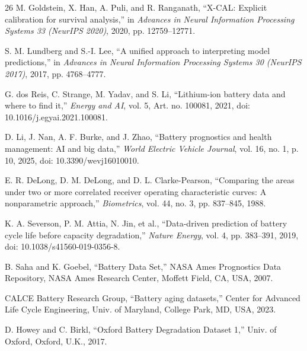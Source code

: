 \documentclass[conference]{IEEEtran}
\begin{document}
\begin{thebibliography}{26}
 M. Goldstein, X. Han, A. Puli, and R. Ranganath, ``X-CAL: Explicit calibration for survival analysis,'' in \emph{Advances in Neural Information Processing Systems 33 (NeurIPS 2020)}, 2020, pp. 12759--12771.

 S. M. Lundberg and S.-I. Lee, ``A unified approach to interpreting model predictions,'' in \emph{Advances in Neural Information Processing Systems 30 (NeurIPS 2017)}, 2017, pp. 4768--4777.

 G. dos Reis, C. Strange, M. Yadav, and S. Li, ``Lithium-ion battery data and where to find it,'' \emph{Energy and AI}, vol. 5, Art. no. 100081, 2021, doi: 10.1016/j.egyai.2021.100081.

 D. Li, J. Nan, A. F. Burke, and J. Zhao, ``Battery prognostics and health management: AI and big data,'' \emph{World Electric Vehicle Journal}, vol. 16, no. 1, p. 10, 2025, doi: 10.3390/wevj16010010.

 E. R. DeLong, D. M. DeLong, and D. L. Clarke-Pearson, ``Comparing the areas under two or more correlated receiver operating characteristic curves: A nonparametric approach,'' \emph{Biometrics}, vol. 44, no. 3, pp. 837--845, 1988.

 K. A. Severson, P. M. Attia, N. Jin, et al., ``Data-driven prediction of battery cycle life before capacity degradation,'' \emph{Nature Energy}, vol. 4, pp. 383--391, 2019, doi: 10.1038/s41560-019-0356-8.

 B. Saha and K. Goebel, ``Battery Data Set,'' NASA Ames Prognostics Data Repository, NASA Ames Research Center, Moffett Field, CA, USA, 2007.

 CALCE Battery Research Group, ``Battery aging datasets,'' Center for Advanced Life Cycle Engineering, Univ. of Maryland, College Park, MD, USA, 2023.

 D. Howey and C. Birkl, ``Oxford Battery Degradation Dataset 1,'' Univ. of Oxford, Oxford, U.K., 2017.

\end{thebibliography}
\end{document}
